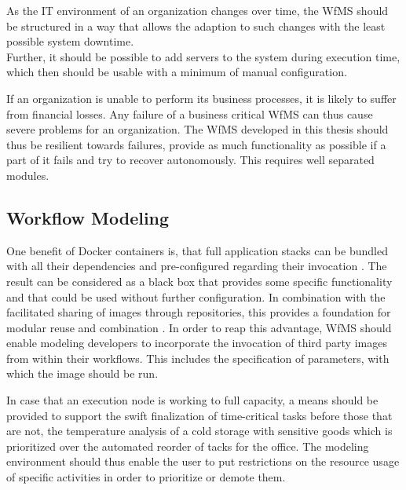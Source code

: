     As the IT environment of an organization changes over time,
    the \ac{WfMS} should be structured in a way that allows the adaption to such changes with the least possible system downtime. \\
    Further, it should be possible to add servers to the system during execution time, which then should be usable with a minimum of manual configuration.

    If an organization is unable to perform its business processes, it is likely to suffer from financial losses. Any failure of a business critical \ac{WfMS} can thus cause severe problems for an organization. The \ac{WfMS} developed in this thesis should thus be resilient towards failures, \ie provide as much functionality as possible if a part of it fails and try to recover autonomously. This requires well separated modules.


\subsection*{Workflow Modeling} %
  \label{ssub:workflow_modeling}

    One benefit of Docker containers is, that full application stacks can be bundled with all their dependencies and pre-configured regarding their invocation \cite[p.~82]{Bernstein2014Containers}. The result can be considered as a black box that provides some specific functionality and that could be used without further configuration. In combination with the facilitated sharing of images through repositories, this provides a foundation for modular reuse and combination \cite[p.~6]{Boettiger2015Introduction}.
    In order to reap this advantage, \ac{WfMS} should enable modeling developers to incorporate the invocation of third party images from within their workflows. This includes the specification of parameters, with which the image should be run.

    In case that an execution node is working to full capacity, a means should be provided to support the swift finalization of time-critical tasks before those that are not, \eg the temperature analysis of a cold storage with sensitive goods which is prioritized over the automated reorder of tacks for the office. The modeling environment should thus enable the user to put restrictions on the resource usage of specific activities in order to prioritize or demote them.


